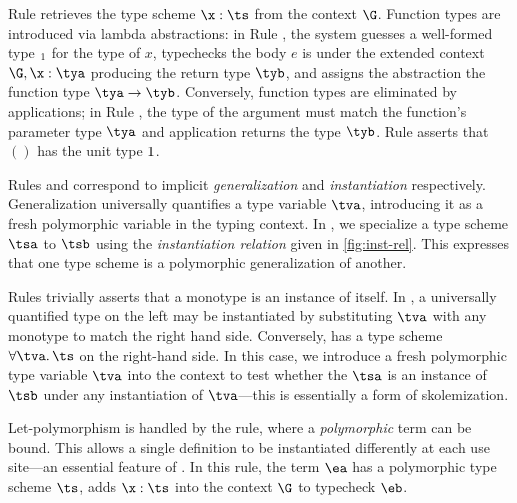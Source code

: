 \documentclass[acmsmall,screen,nonacm]{acmart}
\begin{document}


Rule  retrieves the type scheme $\x : \ts$ from the context $\G$.
Function types are introduced via lambda abstractions: in Rule , the
system guesses a well-formed type $\relax_1$ for the type of $x$, typechecks
the body $e$ is under the extended context $\G, \x : \tya$ producing the
return type $\tyb$, and assigns the abstraction the function type
$\tya \to \tyb$. Conversely, function types are eliminated by applications;
in Rule , the type of the argument must match the function's parameter
type $\tya$ and application returns the type $\tyb$. Rule  asserts
that $()$ has the unit type $1$.


Rules  and  correspond to implicit
\textit{generalization} and \textit{instantiation} respectively.
Generalization universally quantifies a type variable $\tv$, introducing it
as a fresh polymorphic variable in the typing context. In , we
specialize a type scheme $\tsa$ to $\tsb$ using the \emph{instantiation
relation} given in \cref{fig:inst-rel}.  This expresses that one type scheme
is a polymorphic generalization of another.



Rules  trivially asserts that a monotype is an instance of
itself. In , a universally quantified type on the left may be
instantiated by substituting $\tv$ with any monotype to match the right hand
side. Conversely,  has a type scheme $\tfor \tv \ts$ on the
right-hand side. In this case, we introduce a fresh polymorphic type variable
$\tv$ into the context to test whether the $\tsa$ is an instance of $\tsb$
under any instantiation of $\tv$---this is essentially a form of skolemization.


Let-polymorphism is handled by the  rule, where a \textit{polymorphic}
term can be bound. This allows a single definition to be instantiated differently
at each use site---an essential feature of \ML. In this rule, the term $\eone$
has a polymorphic type scheme $\ts$, adds $\x : \ts$ into the context $\G$ to
typecheck $\etwo$.
\end{document}
